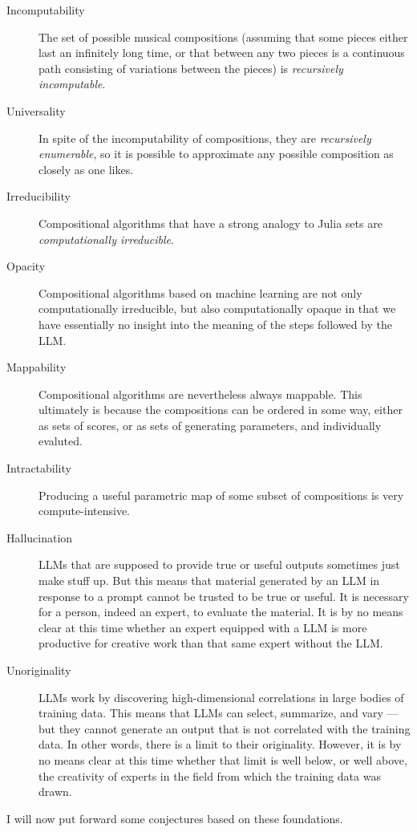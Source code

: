 \documentclass[11pt]{scrartcl}
\begin{document}
\begin{description}
\item[Incomputability] The set of possible musical compositions (assuming that some pieces either last an infinitely long time, or that between any two pieces is a continuous path consisting of variations between the pieces) is \emph{recursively incomputable}.
\item[Universality] In spite of the incomputability of compositions, they are \emph{recursively enumerable}, so it is possible to approximate any possible composition as closely as one likes.
\item[Irreducibility] Compositional algorithms that have a strong analogy to Julia sets are \emph{computationally irreducible}.
\item[Opacity] Compositional algorithms based on machine learning are not only computationally irreducible, but also computationally opaque in that we have essentially no insight into the meaning of the steps followed by the LLM.
\item[Mappability] Compositional algorithms are nevertheless always mappable. This ultimately is because the compositions can be ordered in some way, either as sets of scores, or as sets of generating parameters, and individually evaluted.
\item[Intractability] Producing a useful parametric map of some subset of compositions is very compute-intensive. 
\item[Hallucination] LLMs that are supposed to provide true or useful outputs sometimes just make stuff up. But this means that material generated by an LLM in response to a prompt cannot be trusted to be true or useful. It is necessary for a person, indeed an expert, to evaluate the material. It is by no means clear at this time whether an expert equipped with a LLM is more productive for creative work than that same expert without the LLM.
\item[Unoriginality] LLMs work by discovering high-dimensional correlations in large bodies of training data. This means that LLMs can select, summarize, and vary --- but they cannot generate an output that is not correlated with the training data. In other words, there is a limit to their originality. However, it is by no means clear at this time whether that limit is well below, or well above, the creativity of experts in the field from which the training data was drawn.
\end{description}

I will now put forward some conjectures based on these foundations.
\end{document}
